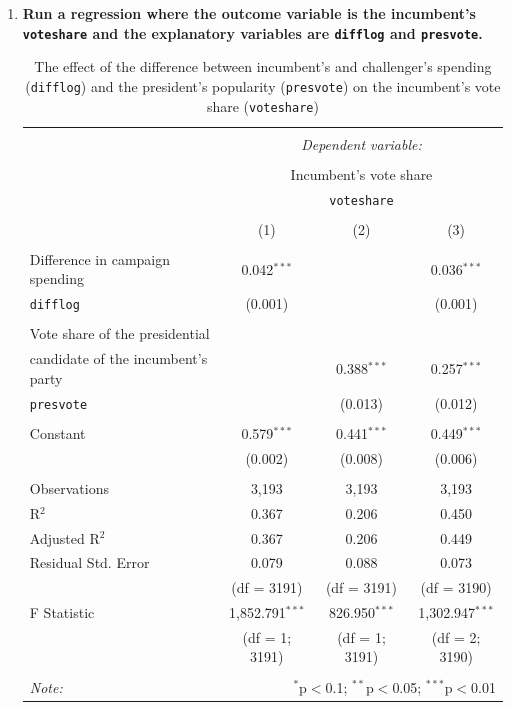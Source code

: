 \documentclass[12pt,letterpaper]{article}
\begin{document}
\begin{enumerate}
	\item \textbf{Run a regression where the outcome variable is the incumbent's \texttt{voteshare} and the explanatory variables are \texttt{difflog} and \texttt{presvote}.}

		

		\begin{table}[H] \centering 
			\caption{The effect of the difference between incumbent's and challenger's spending (\texttt{difflog}) and the president's popularity (\texttt{presvote}) on the incumbent's vote share (\texttt{voteshare})}
			\label{} 
			\begin{tabular}{@{\extracolsep{5pt}}lccc} 
				\\[-1.8ex]\hline 
				\hline \\[-1.8ex] 
				& \multicolumn{3}{c}{\textit{Dependent variable:}} \\ 
				\cline{2-4} 
				\\[-1.8ex] & \multicolumn{3}{c}{Incumbent's vote share} \\
				& & \texttt{voteshare} \\
				\\[-1.8ex] & (1) & (2) & (3)\\ 
				\hline \\[-1.8ex] 
				Difference in campaign spending & 0.042$^{***}$ &  & 0.036$^{***}$ \\ 
				\texttt{difflog} & (0.001) &  & (0.001) \\ 
				& & & \\ 
				Vote share of the presidential \\
				candidate of the incumbent's party &  & 0.388$^{***}$ & 0.257$^{***}$ \\ 
				\texttt{presvote} &  & (0.013) & (0.012) \\ 
				& & & \\ 
				Constant & 0.579$^{***}$ & 0.441$^{***}$ & 0.449$^{***}$ \\ 
				& (0.002) & (0.008) & (0.006) \\
				\hline \\[-1.8ex] 
				Observations & 3,193 & 3,193 & 3,193 \\ 
				R$^{2}$ & 0.367 & 0.206 & 0.450 \\ 
				Adjusted R$^{2}$ & 0.367 & 0.206 & 0.449 \\ 
				Residual Std. Error & 0.079 & 0.088 & 0.073 \\ 
				& (df = 3191) & (df = 3191) & (df = 3190) \\
				F Statistic & 1,852.791$^{***}$ & 826.950$^{***}$ & 1,302.947$^{***}$ \\
				& (df = 1; 3191) & (df = 1; 3191) & (df = 2; 3190) \\
				\hline 
				\hline \\[-1.8ex] 
				\textit{Note:}  & \multicolumn{3}{r}{$^{*}$p$<$0.1; $^{**}$p$<$0.05; $^{***}$p$<$0.01} \\ 
			\end{tabular} 
		\end{table} 


\end{enumerate}
\end{document}
